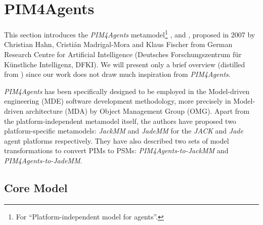 
\section{PIM4Agents}

This section introduces the \textit{PIM4Agents} metamodel\footnote{For ``Platform-independent model for agents''.} \cite{Hahn07a}, \cite{Hahn07b} and \cite{Hahn08}, proposed in 2007 by Christian Hahn, Cristián Madrigal-Mora and Klaus Fischer from German Research Centre for Artificial Intelligence (Deutsches Forschungszentrum f\"{u}r K\"{u}nstliche Intelligenz, DFKI).
We will present only a brief overview (distilled from \cite{Hahn07b}) since our work does not draw much inspiration from \textit{PIM4Agents}.


\textit{PIM4Agents} has been specifically designed to be employed in the Model-driven engineering (MDE) software development methodology, more precisely in Model-driven architecture (MDA) by Object Management Group (OMG).
Apart from the platform-independent metamodel itself, the authors have proposed two platform-specific metamodels: \textit{JackMM} and \textit{JadeMM} for the \textit{JACK} and \textit{Jade} agent platforms respectively.
They have also described two sets of model transformations to convert PIMs to PSMs: \textit{PIM4Agents-to-JackMM} and \textit{PIM4Agents-to-JadeMM}.

\subsection*{Core Model}

